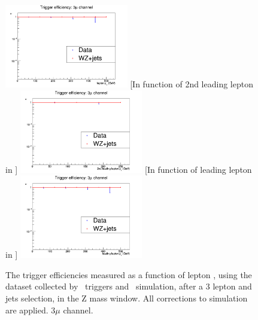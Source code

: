 \begin{figure}[tb]
	[In function of lepton \pt]{
		\includegraphics[width=0.48\textwidth]{Appendix/Figures/trigger/Triggereff/3mu/triggeff_3muhistPt.png}
		\label{image:triggeff_3muhistPt.png}
	}
	[In function of 2nd leading lepton in \pt]{
		\includegraphics[width=0.48\textwidth]{Appendix/Figures/trigger/Triggereff/3mu/triggeff_3muhistPt_2ndleadinglep.png}
		\label{image:triggeff_3muhistPt_2ndleadinglep.png}
	}
	[In function of leading lepton in \pt]{
		\includegraphics[width=0.48\textwidth]{Appendix/Figures/trigger/Triggereff/3mu/triggeff_3muhistPt_leadinglep.png}
		\label{image:triggeff_3muhistPt_leadinglep.png}
	}
	\caption{The trigger efficiencies measured as a function of lepton \pt, using the dataset collected by \Etmis\ triggers and \WZ\ simulation, after a 3 lepton and jets selection, in the Z mass window. All corrections to simulation are applied. 3$\mu$ channel.}
	\label{image:FigurestriggerTriggereff3mu}
\end{figure}

